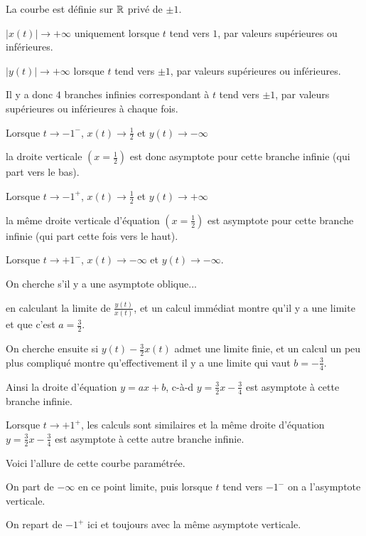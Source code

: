La courbe est définie sur $\mathbb{R}$ privé de $\pm 1$.
  
  
$|x(t)| \to +\infty$ uniquement lorsque $t$ tend vers  $1$, 
par valeurs supérieures ou inférieures.

$|y(t)| \to +\infty$ lorsque $t$ tend vers  $\pm 1$, 
par valeurs supérieures ou inférieures.

\change
Il y a donc $4$ branches infinies correspondant à 
$t$ tend vers $\pm 1$, par valeurs supérieures ou inférieures 
à chaque fois.

\change
Lorsque $t\to-1^-$, $x(t) \to \frac12$ et $y(t) \to -\infty$

\change
  la droite verticale $(x=\frac12)$ est donc asymptote 
  pour cette branche infinie (qui part vers le bas).

\change

Lorsque $t\to-1^+$, $x(t) \to \frac12$ et $y(t) \to +\infty$

\change
  la même droite verticale d'équation $(x=\frac12)$ est  asymptote 
  pour cette branche infinie (qui part cette fois vers le haut).  

\change

Lorsque $t\to +1^-$, $x(t) \to -\infty$ et $y(t) \to -\infty$.
  

On cherche s'il y a une asymptote oblique... 

\change
en calculant la limite de  $\frac{y(t)}{x(t)}$, et 
un calcul immédiat montre qu'il y a une limite et que 
c'est $a=\frac32$.

\change
 On cherche ensuite si $y(t)-\frac32 x(t)$ admet une limite finie, 
 et un calcul un peu plus compliqué montre qu'effectivement il y a une limite
 qui vaut $b=-\frac34$.

\change
Ainsi la droite d'équation $y=ax+b$, c-à-d $y = \frac32 x -\frac34$ est 
asymptote à cette branche infinie.

   \change

 Lorsque $t\to +1^+$, les calculs sont similaires
  et la même droite d'équation $y = \frac32 x -\frac34$ est asymptote 
  à cette autre branche infinie.

\diapo

Voici l'allure de cette courbe paramétrée. 

\change
On part de $-\infty$ en ce point limite, puis lorsque $t$ tend vers $-1^-$ on a l'asymptote
verticale. 

\change
On repart de $-1^+$ ici et toujours avec la même asymptote verticale.

